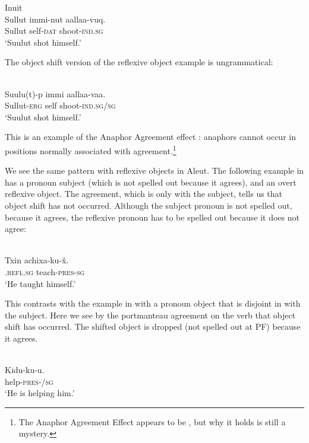 \documentclass[output=paper]{LSP/langsci}
\begin{document}
\ea\label{ex:woolford:29}
Inuit \citep[82]{bittner1994case}\\
\gll Sullut    immi-nut  aallaa-vuq.          \\
     Sullut    self-\textsc{dat}  shoot-\textsc{ind}.\textsc{sg}\\
\glt ‘Suulut shot himself.’
\z

The object shift version of the reflexive object example is ungrammatical:

\ea\label{ex:woolford:30}
\\
\gll *Suulu(t)-p  immi  aallaa-vaa.                   \\
      Sullut-\textsc{erg}  self  shoot-\textsc{ind}.\textsc{sg}/\textsc{sg}     \\
\glt  ‘Suulut shot himself.’ 
\z

This is an example of the Anaphor Agreement effect \citep{rizzi1990anaphor,woolford1999more}: anaphors cannot occur in positions normally associated with agreement.\footnote{The Anaphor Agreement Effect appears to be  \citep{woolford1999more}, but why it holds is still a mystery.} 

We see the same pattern with reflexive objects in Aleut. The following example in  has a pronoun subject (which is not spelled out because it agrees), and an overt reflexive object. The agreement, which is only with the subject, tells us that object shift has not occurred. Although the subject pronoun is not spelled out, because it agrees, the reflexive pronoun has to be spelled out because it does not agree:

\ea\label{ex:woolford:31}
\\
\gll Txin     achixa{}-ku-\^{x}.     \\
     .\textsc{refl.sg}    teach-\textsc{pres}-\textsc{sg}    \\
\glt ‘He taught himself.'
\z

This contrasts with the example in  with a pronoun object that is disjoint in  with the subject. Here we see by the portmanteau agreement on the verb that object shift has occurred. The shifted object is dropped (not spelled out at PF) because it agrees.

\ea\label{ex:woolford:32}
\\
\gll Kidu-ku-u.        \\
     help-\textsc{pres}-/\textsc{sg}  \\
\glt ‘He is helping him.’
\z
\end{document}
